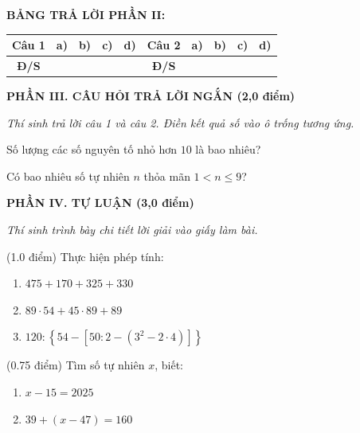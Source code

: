 \documentclass[12pt,a4paper]{article}
\begin{document}
\noindent\textbf{BẢNG TRẢ LỜI PHẦN II:}
\begin{center}
\begin{tabular}{|c|c|c|c|c||c|c|c|c|c|}
\hline
\textbf{Câu 1} & \textbf{a)} & \textbf{b)} & \textbf{c)} & \textbf{d)} & \textbf{Câu 2} & \textbf{a)} & \textbf{b)} & \textbf{c)} & \textbf{d)} \\
\hline
\textbf{Đ/S} & \rule{0pt}{0.6cm} & & & & \textbf{Đ/S} & & & & \\
\hline
\end{tabular}
\end{center}
\vspace{2mm}

\setcounter{ex}{0}
\noindent\textbf{\large PHẦN III. CÂU HỎI TRẢ LỜI NGẮN (2,0 điểm)}

\textit{Thí sinh trả lời câu 1 và câu 2. Điền kết quả số vào ô trống tương ứng.}

\vspace{1mm}
\begin{ex}
Số lượng các số nguyên tố nhỏ hơn $10$ là bao nhiêu? 
\end{ex}

\begin{ex}
Có bao nhiêu số tự nhiên $n$ thỏa mãn $1 < n \le 9$? 
\end{ex}


\setcounter{ex}{0}
\noindent\textbf{\large PHẦN IV. TỰ LUẬN (3,0 điểm)}

\textit{Thí sinh trình bày chi tiết lời giải vào giấy làm bài.}

\vspace{1mm}
\begin{ex} (1.0 điểm)
Thực hiện phép tính:
\begin{enumerate}[label=\textbf{\alph*)}, leftmargin=0.8cm, itemsep=2pt]
\item $475 + 170 + 325 + 330$
\item $89 \cdot 54 + 45 \cdot 89 + 89$
\item $120 : \left\{ 54 - \left[ 50 : 2 - (3^2 - 2 \cdot 4) \right] \right\}$
\end{enumerate}
\end{ex}
\vspace{1.5mm}

\begin{ex} (0.75 điểm)
Tìm số tự nhiên $x$, biết:
\begin{enumerate}[label=\textbf{\alph*)}, leftmargin=0.8cm, itemsep=2pt]
\item $x - 15 = 2025$
\item $39 + (x - 47) = 160$
\end{enumerate}
\end{ex}
\vspace{1.5mm}
\end{document}
